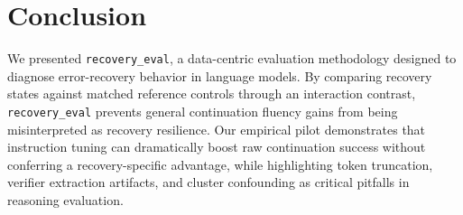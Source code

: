 \documentclass[conference]{IEEEtran}
\begin{document}
\section{Conclusion}
We presented \texttt{recovery\_eval}, a data-centric evaluation methodology designed to diagnose error-recovery behavior in language models. By comparing recovery states against matched reference controls through an interaction contrast, \texttt{recovery\_eval} prevents general continuation fluency gains from being misinterpreted as recovery resilience. Our empirical pilot demonstrates that instruction tuning can dramatically boost raw continuation success without conferring a recovery-specific advantage, while highlighting token truncation, verifier extraction artifacts, and cluster confounding as critical pitfalls in reasoning evaluation.



\end{document}
